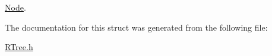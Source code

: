 \hyperlink{structRTree_1_1Node}{Node}. 



The documentation for this struct was generated from the following file\-:\begin{DoxyCompactItemize}
\item 
\hyperlink{RTree_8h}{R\-Tree.\-h}\end{DoxyCompactItemize}
